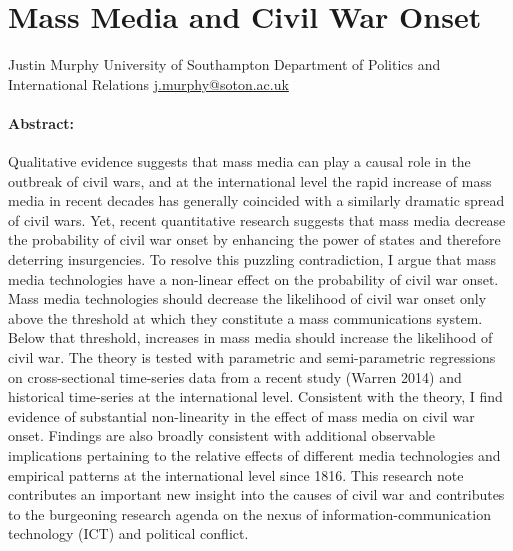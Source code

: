 \documentclass[11pt,article,oneside]{memoir}
\author{}
\date{}
\begin{document}
  
\setsansfont[Mapping=tex-text]{Gill Sans} 
\setmonofont[Mapping=tex-text,Scale=0.8]{Consolas}
\pagestyle{kjh}

\singlespacing





\thispagestyle{empty}

\section{Mass Media and Civil War
Onset}\label{mass-media-and-civil-war-onset}

Justin Murphy \newline
University of Southampton \newline     
Department of Politics and International Relations \newline     
\href{mailto:j.murphy@soton.ac.uk}{j.murphy@soton.ac.uk} \newline    

\paragraph{Abstract:}\label{abstract}

Qualitative evidence suggests that mass media can play a causal role in
the outbreak of civil wars, and at the international level the rapid
increase of mass media in recent decades has generally coincided with a
similarly dramatic spread of civil wars. Yet, recent quantitative
research suggests that mass media decrease the probability of civil war
onset by enhancing the power of states and therefore deterring
insurgencies. To resolve this puzzling contradiction, I argue that mass
media technologies have a non-linear effect on the probability of civil
war onset. Mass media technologies should decrease the likelihood of
civil war onset only above the threshold at which they constitute a mass
communications system. Below that threshold, increases in mass media
should increase the likelihood of civil war. The theory is tested with
parametric and semi-parametric regressions on cross-sectional
time-series data from a recent study (Warren 2014) and historical
time-series at the international level. Consistent with the theory, I
find evidence of substantial non-linearity in the effect of mass media
on civil war onset. Findings are also broadly consistent with additional
observable implications pertaining to the relative effects of different
media technologies and empirical patterns at the international level
since 1816. This research note contributes an important new insight into
the causes of civil war and contributes to the burgeoning research
agenda on the nexus of information-communication technology (ICT) and
political conflict.\newline
\end{document}
